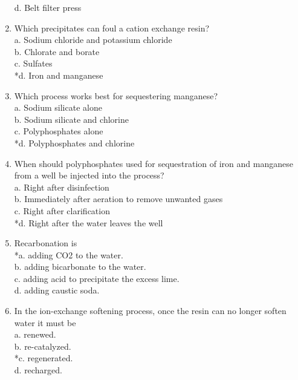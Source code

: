 \begin{enumerate}[label=TIII-\arabic*]
d. Belt filter press\\
 \item Which precipitates can foul a cation exchange resin?\\
a. Sodium chloride and potassium chloride\\
b. Chlorate and borate\\
c. Sulfates\\
*d. Iron and manganese\\
  \item Which process works best for sequestering manganese?\\
a. Sodium silicate alone\\
b. Sodium silicate and chlorine\\
c. Polyphosphates alone\\
*d. Polyphosphates and chlorine\\
  \item When should polyphosphates used for sequestration of iron and manganese from a well be injected into the process?\\
a. Right after disinfection\\
b. Immediately after aeration to remove unwanted gases\\
c. Right after clarification\\
*d. Right after the water leaves the well\\
  \item Recarbonation is\\
*a. adding CO2 to the water.\\
b. adding bicarbonate to the water.\\
c. adding acid to precipitate the excess lime.\\
d. adding caustic soda.\\
  \item In the ion-exchange softening process, once the resin can no longer soften water it must be\\
a. renewed.\\
b. re-catalyzed.\\
*c. regenerated.\\
d. recharged.\\
\end{enumerate}
